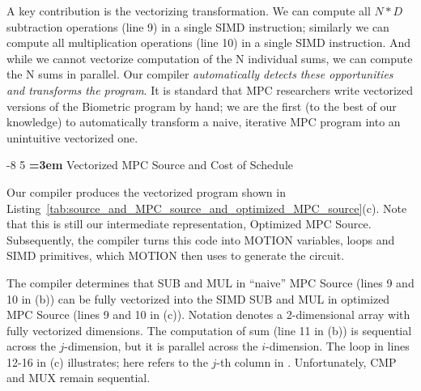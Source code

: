 \documentclass[sigconf, screen, natbib=false, dvipsnames, table]{acmart}
\makeatletter
\renewcommand{\subsection}{\@startsection{subsection}{2}{\z@}%
                        {-8\p@ \@plus -4\p@ \@minus -4\p@}%
                        {5\p@ \@plus 2\p@ \@minus 2\p@}%
                        {\normalfont\Large\bfseries\boldmath
                         \rightskip=\z@ \@plus 3em\pretolerance=10000 }}
\theoremstyle{definition}
\makeatother
\begin{document}
A key contribution is the vectorizing transformation. We can compute all $N*D$ 
subtraction operations (line 9) in a single SIMD instruction; similarly we can compute 
all multiplication operations (line 10) in a single SIMD instruction. And while we cannot
vectorize computation of the N individual sums, we can compute the N sums in parallel. 
Our compiler \emph{automatically detects these opportunities and transforms the program}. 
It is standard that MPC researchers write vectorized versions of the Biometric
program by hand; we are the first (to the best of our knowledge) to automatically 
transform a naive, iterative MPC program into an unintuitive vectorized one.

\subsection{Vectorized MPC Source and Cost of Schedule}

Our compiler produces the vectorized program shown in Listing~\ref{tab:source_and_MPC_source_and_optimized_MPC_source}(c). 
Note that this is still our intermediate representation, Optimized MPC Source. Subsequently,
the compiler turns this code into MOTION variables, loops and SIMD primitives, which MOTION then 
uses to generate the circuit.

The compiler determines that SUB and MUL in ``naive'' MPC Source (lines 9 and 10 in (b))
can be fully vectorized into the SIMD SUB and MUL in optimized MPC Source (lines 9 and 10 in (c)). 
Notation  denotes a 2-dimensional array with fully vectorized dimensions.
The computation of sum (line 11 in (b))
is sequential across the $j$-dimension, but it is parallel across the $i$-dimension. 
The loop in lines 12-16 in (c) illustrates; here  refers to the $j$-th column in . 
Unfortunately, CMP and MUX remain sequential.

\end{document}
